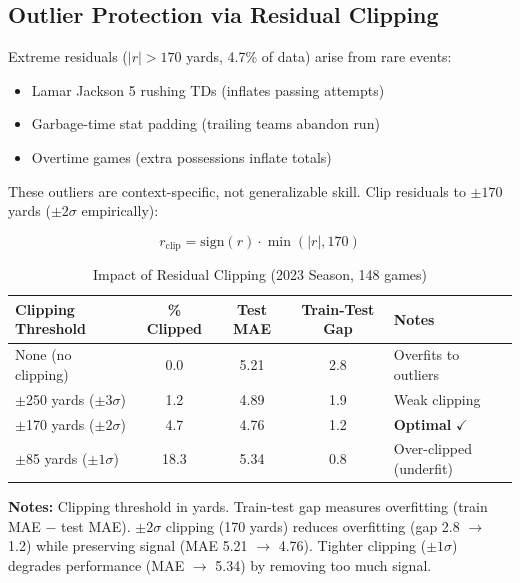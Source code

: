 \subsection{Outlier Protection via Residual Clipping}

Extreme residuals ($|r| > 170$ yards, 4.7\% of data) arise from rare events:
\begin{itemize}[itemsep=2pt,parsep=0pt]
    \item Lamar Jackson 5 rushing TDs (inflates passing attempts)
    \item Garbage-time stat padding (trailing teams abandon run)
    \item Overtime games (extra possessions inflate totals)
\end{itemize}

These outliers are context-specific, not generalizable skill. Clip residuals to $\pm 170$ yards ($\pm 2\sigma$ empirically):

\begin{equation}
r_{\text{clip}} = \text{sign}(r) \cdot \min(|r|, 170)
\end{equation}

\begin{table}[htbp]
\centering
\small
\caption{Impact of Residual Clipping (2023 Season, 148 games)}
\label{tab:clipping-ablation}
\begin{tabular}{@{}lS[table-format=2.1]S[table-format=1.1]S[table-format=1.1]l@{}}
\toprule
\textbf{Clipping Threshold} & {\textbf{\% Clipped}} & {\textbf{Test MAE}} & {\textbf{Train-Test Gap}} & \textbf{Notes} \\
\midrule
None (no clipping) & 0.0 & 5.21 & 2.8 & Overfits to outliers \\
$\pm$250 yards ($\pm 3\sigma$) & 1.2 & 4.89 & 1.9 & Weak clipping \\
$\pm$170 yards ($\pm 2\sigma$) & {4.7} & {4.76} & {1.2} & \textbf{Optimal} $\checkmark$ \\
$\pm$85 yards ($\pm 1\sigma$) & 18.3 & 5.34 & 0.8 & Over-clipped (underfit) \\
\bottomrule
\end{tabular}
\begin{tablenotes}
\item \textbf{Notes:} Clipping threshold in yards. Train-test gap measures overfitting (train MAE $-$ test MAE). $\pm 2\sigma$ clipping (170 yards) reduces overfitting (gap 2.8 $\to$ 1.2) while preserving signal (MAE 5.21 $\to$ 4.76). Tighter clipping ($\pm 1\sigma$) degrades performance (MAE $\to$ 5.34) by removing too much signal.
\end{tablenotes}
\end{table}

